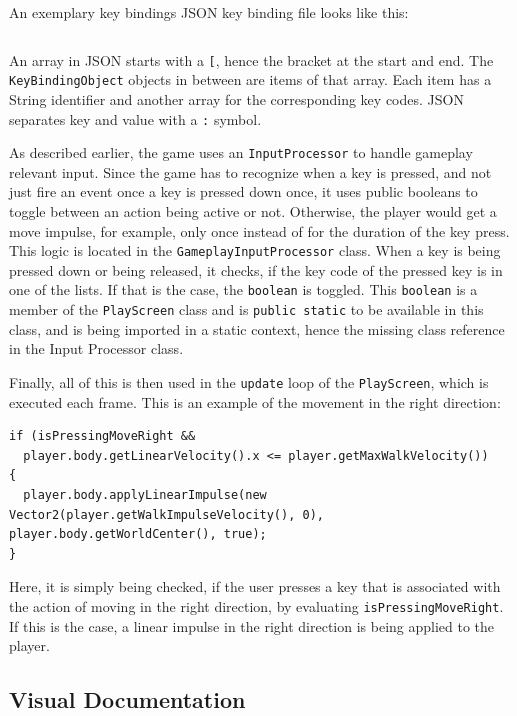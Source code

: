 \documentclass[12p]{article}
\begin{document}
An exemplary key bindings JSON key binding file looks like this:
\inputminted[linenos,breaklines]{json}{code/json/keybindings.json}

An array in JSON starts with a \texttt{[}, hence the bracket at the start and end. The \texttt{KeyBindingObject} objects in between are items of that array. Each item has a String identifier and another array for the corresponding key codes. JSON separates key and value with a \texttt{:} symbol.

As described earlier, the game uses an \texttt{InputProcessor} to handle gameplay relevant input. Since the game has to recognize when a key is pressed, and not just fire an event once a key is pressed down once, it uses public booleans to toggle between an action being active or not. Otherwise, the player would get a move impulse, for example, only once instead of for the duration of the key press. This logic is located in the \texttt{GameplayInputProcessor} class. When a key is being pressed down or being released, it checks, if the key code of the pressed key is in one of the lists. If that is the case, the \texttt{boolean} is toggled. This \texttt{boolean} is a member of the \texttt{PlayScreen} class and is \texttt{public static} to be available in this class, and is being imported in a static context, hence the missing class reference in the Input Processor class.

Finally, all of this is then used in the \texttt{update} loop of the \texttt{PlayScreen}, which is executed each frame. This is an example of the movement in the right direction:

\begin{verbatim}
if (isPressingMoveRight &&
  player.body.getLinearVelocity().x <= player.getMaxWalkVelocity()) 
{
  player.body.applyLinearImpulse(new Vector2(player.getWalkImpulseVelocity(), 0), player.body.getWorldCenter(), true);
}
\end{verbatim}

Here, it is simply being checked, if the user presses a key that is associated with the action of moving in the right direction, by evaluating \texttt{isPressingMoveRight}. If this is the case, a linear impulse in the right direction is being applied to the player.


\subsection{Visual Documentation} \label{DocVisual}
\end{document}

